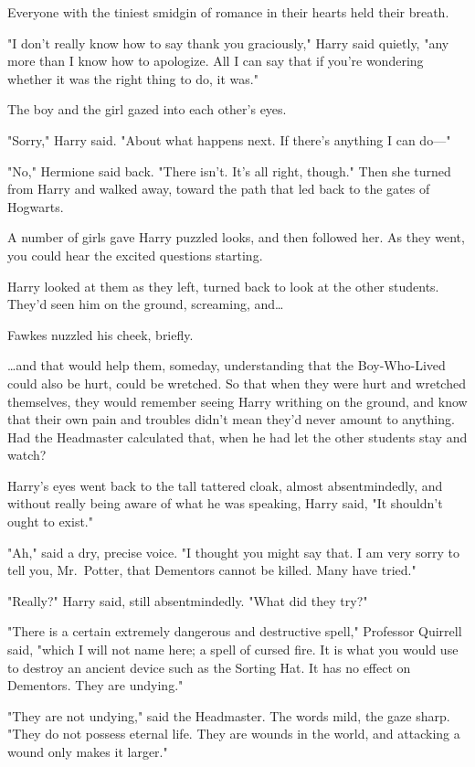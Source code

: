 Everyone with the tiniest smidgin of romance in their hearts held their breath.

"I don't really know how to say thank you graciously," Harry said quietly, "any
more than I know how to apologize. All I can say that if you're wondering
whether it was the right thing to do, it was."

The boy and the girl gazed into each other's eyes.

"Sorry," Harry said. "About what happens next. If there's anything I can do---"

"No," Hermione said back. "There isn't. It's all right, though." Then she
turned from Harry and walked away, toward the path that led back to the gates
of Hogwarts.

A number of girls gave Harry puzzled looks, and then followed her. As they
went, you could hear the excited questions starting.

Harry looked at them as they left, turned back to look at the other students.
They'd seen him on the ground, screaming, and{\ldots}

Fawkes nuzzled his cheek, briefly.

{\ldots}and that would help them, someday, understanding that the Boy-Who-Lived
could also be hurt, could be wretched. So that when they were hurt and wretched
themselves, they would remember seeing Harry writhing on the ground, and know
that their own pain and troubles didn't mean they'd never amount to anything.
Had the Headmaster calculated that, when he had let the other students stay and
watch?

Harry's eyes went back to the tall tattered cloak, almost absentmindedly, and
without really being aware of what he was speaking, Harry said, "It shouldn't
ought to exist."

"Ah," said a dry, precise voice. "I thought you might say that. I am very sorry
to tell you, Mr.~Potter, that Dementors cannot be killed. Many have tried."

"Really?" Harry said, still absentmindedly. "What did they try?"

"There is a certain extremely dangerous and destructive spell," Professor
Quirrell said, "which I will not name here; a spell of cursed fire. It is what
you would use to destroy an ancient device such as the Sorting Hat. It has no
effect on Dementors. They are undying."

"They are not undying," said the Headmaster. The words mild, the gaze sharp.
"They do not possess eternal life. They are wounds in the world, and attacking
a wound only makes it larger."

